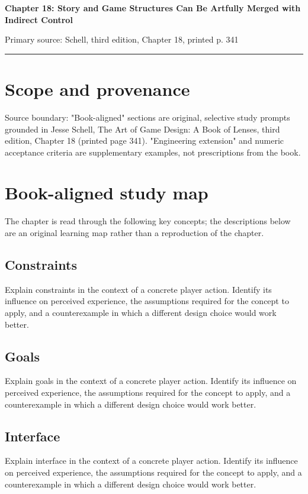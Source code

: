 \documentclass[11pt]{article}
\begin{document}
{\huge\bfseries\color{suiteblue} Chapter 18: Story and Game Structures Can Be Artfully Merged with Indirect Control}\par
\vspace{0.15in}
{\normalsize\color{suitegray} Primary source: Schell, third edition, Chapter 18, printed p. 341}\par
\vspace{0.15in}\hrule\vspace{0.15in}

\section{Scope and provenance}
Source boundary: "Book-aligned" sections are original, selective study prompts grounded in Jesse Schell, The Art of Game Design: A Book of Lenses, third edition, Chapter 18 (printed page 341). "Engineering extension" and numeric acceptance criteria are supplementary examples, not prescriptions from the book.


\section{Book-aligned study map}
The chapter is read through the following key concepts; the descriptions below are an original learning map rather than a reproduction of the chapter.


\subsection{Constraints}
Explain constraints in the context of a concrete player action. Identify its influence on perceived experience, the assumptions required for the concept to apply, and a counterexample in which a different design choice would work better.


\subsection{Goals}
Explain goals in the context of a concrete player action. Identify its influence on perceived experience, the assumptions required for the concept to apply, and a counterexample in which a different design choice would work better.


\subsection{Interface}
Explain interface in the context of a concrete player action. Identify its influence on perceived experience, the assumptions required for the concept to apply, and a counterexample in which a different design choice would work better.
\end{document}
